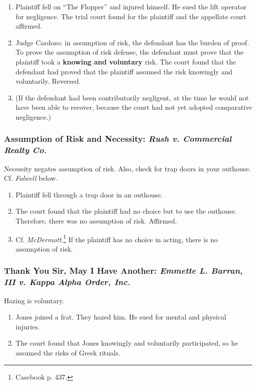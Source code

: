 \begin{enumerate}
    \item Plaintiff fell on ``The Flopper'' and injured himself. He sued the 
    lift operator for negligence. The trial court found for the plaintiff and 
    the appellate court affirmed.
    \item Judge Cardozo: in assumption of risk, the defendant has the burden 
    of proof. To prove the assumption of risk defense, the defendant must 
    prove that the plaintiff took a \textbf{knowing and voluntary} risk. The 
    court found that the defendant had proved that the plaintiff assumed the 
    risk knowingly and voluntarily. Reversed.
    \item (If the defendant had been contributorily negligent, at the time he 
    would not have been able to recover, because the court had not yet adopted 
    comparative negligence.)
\end{enumerate}

\subsubsection{Assumption of Risk and Necessity: \emph{Rush v. Commercial 
Realty Co.}}

Necessity negates assumption of risk. Also, check for trap doors in your 
outhouse. Cf. \emph{Falwell} below.

\begin{enumerate}
    \item Plaintiff fell through a trap door in an outhouse.
    \item The court found that the plaintiff had no choice but to use the 
    outhouse. Therefore, there was no assumption of risk. Affirmed.
    \item Cf. \emph{McDermott}.\footnote{Casebook p. 437.} If the plaintiff 
    has no choice in acting, there is no assumption of risk.
\end{enumerate}

\subsubsection{Thank You Sir, May I Have Another: \emph{Emmette L. Barran, III 
v. Kappa Alpha Order, Inc.}}

Hazing is voluntary.

\begin{enumerate}
    \item Jones joined a frat. They hazed him. He sued for mental and physical 
    injuries.
    \item The court found that Jones knowingly and voluntarily participated, 
    so he assumed the risks of Greek rituals.
\end{enumerate}

